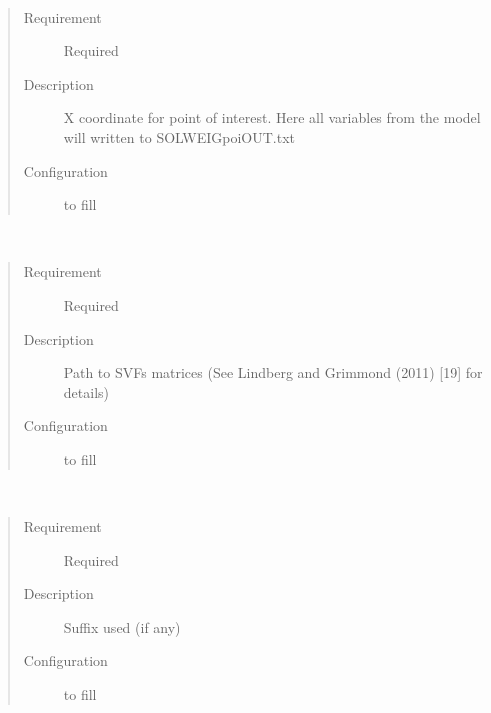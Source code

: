 \documentclass[letterpaper,10pt,english]{sphinxmanual}
\begin{document}
\begin{fulllineitems}
\label{\detokenize{input_files/SOLWEIG_input/SOLWEIGinput:cmdoption-arg-row}}~\begin{quote}\begin{description}
\item[{Requirement}] \leavevmode
Required

\item[{Description}] \leavevmode
X coordinate for point of interest. Here all variables from the model will written to SOLWEIGpoiOUT.txt

\item[{Configuration}] \leavevmode
to fill

\end{description}\end{quote}

\end{fulllineitems}


\begin{fulllineitems}
\label{\detokenize{input_files/SOLWEIG_input/SOLWEIGinput:cmdoption-arg-svfpath}}~\begin{quote}\begin{description}
\item[{Requirement}] \leavevmode
Required

\item[{Description}] \leavevmode
Path to SVFs matrices (See Lindberg and Grimmond (2011) {[}19{]} for details)

\item[{Configuration}] \leavevmode
to fill

\end{description}\end{quote}

\end{fulllineitems}


\begin{fulllineitems}
\label{\detokenize{input_files/SOLWEIG_input/SOLWEIGinput:cmdoption-arg-svfsuffix}}~\begin{quote}\begin{description}
\item[{Requirement}] \leavevmode
Required

\item[{Description}] \leavevmode
Suffix used (if any)

\item[{Configuration}] \leavevmode
to fill

\end{description}\end{quote}

\end{fulllineitems}
\end{document}
